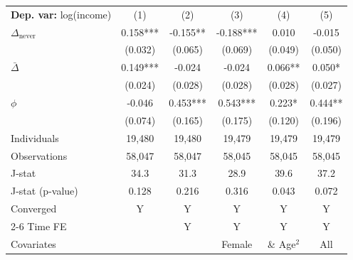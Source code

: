 \begin{tabular}{l ccccc} \toprule  \textbf{Dep. var:}  log(income) 
                    &\multicolumn{1}{c}{(1)}   &\multicolumn{1}{c}{(2)}   &\multicolumn{1}{c}{(3)}   &\multicolumn{1}{c}{(4)}   &\multicolumn{1}{c}{(5)}   \\

\addlinespace
$\Delta_{\text{never}}$&       0.158***&      -0.155** &      -0.188***&       0.010   &      -0.015   \\
                    &     (0.032)   &     (0.065)   &     (0.069)   &     (0.049)   &     (0.050)   \\

\addlinespace
$\bar{\Delta}$      &       0.149***&      -0.024   &      -0.024   &       0.066** &       0.050*  \\
                    &     (0.024)   &     (0.028)   &     (0.028)   &     (0.028)   &     (0.027)   \\

\addlinespace
$\phi$              &      -0.046   &       0.453***&       0.543***&       0.223*  &       0.444** \\
                    &     (0.074)   &     (0.165)   &     (0.175)   &     (0.120)   &     (0.196)   \\
\addlinespace
Individuals         &      19,480   &      19,480   &      19,479   &      19,479   &      19,479   \\
Observations        &      58,047   &      58,047   &      58,045   &      58,045   &      58,045   \\
J-stat              &        34.3   &        31.3   &        28.9   &        39.6   &        37.2   \\
J-stat (p-value)    &       0.128   &       0.216   &       0.316   &       0.043   &       0.072   \\
Converged           &           Y   &           Y   &           Y   &           Y   &           Y   \\
\cmidrule{2-6} Time FE & & Y & Y & Y & Y \\ Covariates & & & Female & \& Age$^2$ & All \\ \bottomrule \end{tabular}
